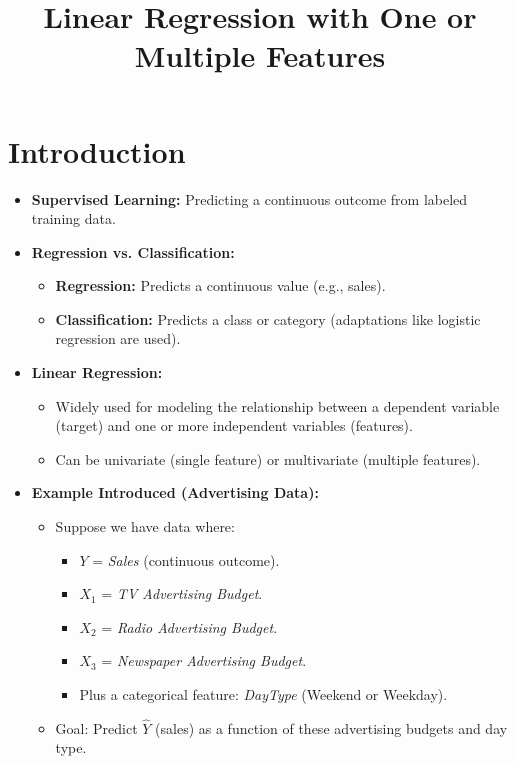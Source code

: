 \documentclass[10pt]{article}
\title{Linear Regression with One or Multiple Features}
\author{}
\date{}
\begin{document}
\maketitle

\section{Introduction}
\begin{itemize}
    \item \textbf{Supervised Learning:} Predicting a continuous outcome from labeled training data.
    \item \textbf{Regression vs. Classification:}
    \begin{itemize}
        \item \textbf{Regression:} Predicts a continuous value (e.g., sales).
        \item \textbf{Classification:} Predicts a class or category (adaptations like logistic regression are used).
    \end{itemize}
    \item \textbf{Linear Regression:} 
    \begin{itemize}
        \item Widely used for modeling the relationship between a dependent variable (target) and one or more independent variables (features).
        \item Can be univariate (single feature) or multivariate (multiple features).
    \end{itemize}
    \item \textbf{Example Introduced (Advertising Data):}
    \begin{itemize}
        \item Suppose we have data where:
        \begin{itemize}
            \item \(Y\) = \textit{Sales} (continuous outcome).
            \item \(X_1\) = \textit{TV Advertising Budget}.
            \item \(X_2\) = \textit{Radio Advertising Budget}.
            \item \(X_3\) = \textit{Newspaper Advertising Budget}.
            \item Plus a categorical feature: \textit{DayType} (Weekend or Weekday).
        \end{itemize}
        \item Goal: Predict \(\hat{Y}\) (sales) as a function of these advertising budgets and day type.
    \end{itemize}
\end{itemize}
\end{document}
